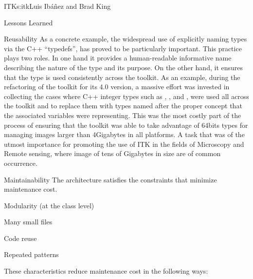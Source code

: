 \begin{aosachapter}{ITK}{s:itk}{Luis Ib\'{a}\~{n}ez and Brad King}
\begin{aosasect1}{Lessons Learned}
\begin{aosasect2}{Reusability}
As a concrete example, the widespread use of explicitly naming types via the C++
``typedefs'', has proved to be particularly important. This practice plays two
roles. In one hand it provides a human-readable informative name describing the
nature of the type and its purpose. On the other hand, it ensures that the type
is used consistently across the toolkit. As an example, during the refactoring
of the toolkit for its 4.0 version, a massive effort was invested in collecting
the cases where C++ integer types such as , ,
 and , were used all across the toolkit and to
replace them with types named after the proper concept that the associated
variables were representing. This was the most costly part of the process of
ensuring that the toolkit was able to take advantage of 64bits types for
managing images larger than 4Gigabytes in all platforms. A task that was of the
utmost importance for promoting the use of ITK in the fields of Microscopy and
Remote sensing, where image of tens of Gigabytes in size are of common
occurrence.
\end{aosasect2}

\begin{aosasect2}{Maintainability}
The architecture satisfies the constraints that minimize maintenance cost.
\begin{aosaitemize}
\item Modularity (at the class level)
\item Many small files
\item Code reuse
\item Repeated patterns
\end{aosaitemize}
\end{aosasect2}

These characteristics reduce maintenance cost in the following ways:


\end{aosasect1}
\end{aosachapter}
